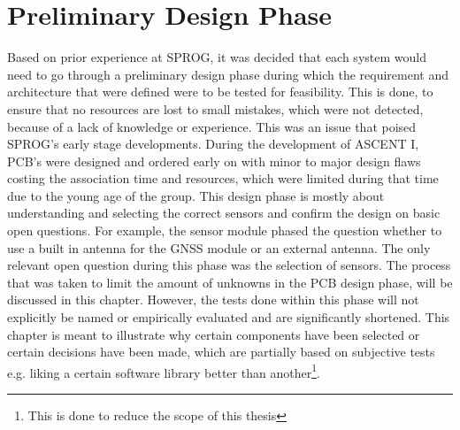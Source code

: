 \documentclass[fontsize=11pt,%
twoside,%
BCOR          = 8mm, %
DIV           = 11,  %
titlepage     = off,%
index=totoc,%
xcolor        = pdftex,%
dvipsnames,%
bibliography  = totoc,%
bibliography = numbered, %
listof        = notnumbered]{scrreprt}
\begin{document}
\newpage

\chapter{Preliminary Design Phase}
Based on prior experience at SPROG, it was decided that each system would need to go through a preliminary design phase during which the requirement and architecture that were defined were to be tested for feasibility. This is done, to ensure that no resources are lost to small mistakes, which were not detected, because of a lack of knowledge or experience. This was an issue that poised SPROG's early stage developments. During the development of ASCENT I, PCB's were designed and ordered early on with minor to major design flaws costing the association time and resources, which were limited during that time due to the young age of the group. This design phase is mostly about understanding and selecting the correct sensors and confirm the design on basic open questions. For example, the sensor module phased the question whether to use a built in antenna for the GNSS module or an external antenna. The only relevant open question during this phase was the selection of sensors. The process that was taken to limit the amount of unknowns in the PCB design phase, will be discussed in this chapter. However, the tests done within this phase will not explicitly be named or empirically evaluated and are significantly shortened. This chapter is meant to illustrate why certain components have been selected or certain decisions have been made, which are partially based on subjective tests e.g. liking a certain software library better than another\footnote{This is done to reduce the scope of this thesis}.
\end{document}
